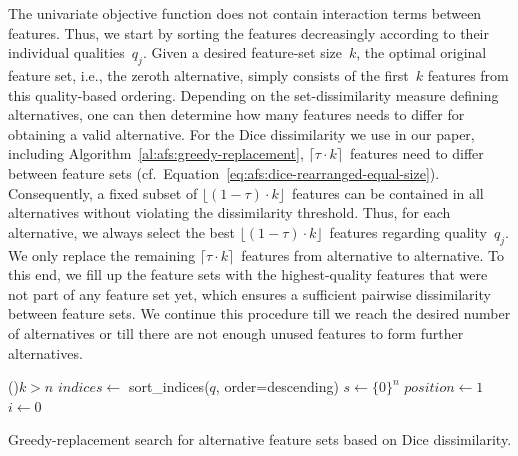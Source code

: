 \documentclass{article}
\theoremstyle{definition}
\begin{document}
The univariate objective function does not contain interaction terms between features.
Thus, we start by sorting the features decreasingly according to their individual qualities~$q_j$.
Given a desired feature-set size~$k$, the optimal original feature set, i.e., the zeroth alternative, simply consists of the first~$k$ features from this quality-based ordering.
Depending on the set-dissimilarity measure defining alternatives, one can then determine how many features needs to differ for obtaining a valid alternative.
For the Dice dissimilarity we use in our paper, including Algorithm~\ref{al:afs:greedy-replacement}, $\lceil \tau \cdot k \rceil$~features need to differ between feature sets (cf.~Equation~\ref{eq:afs:dice-rearranged-equal-size}).
Consequently, a fixed subset of $\lfloor (1 - \tau) \cdot k \rfloor$~features can be contained in all alternatives without violating the dissimilarity threshold.
Thus, for each alternative, we always select the best $\lfloor (1 - \tau) \cdot k \rfloor$~features regarding quality~$q_j$.
We only replace the remaining $\lceil \tau \cdot k \rceil$~features from alternative to alternative.
To this end, we fill up the feature sets with the highest-quality features that were not part of any feature set yet, which ensures a sufficient pairwise dissimilarity between feature sets.
We continue this procedure till we reach the desired number of alternatives or till there are not enough unused features to form further alternatives.

\begin{algorithm}[htb]
	\DontPrintSemicolon
	\BlankLine
	\If(){$k > n$}{
		\Return{$\emptyset$}
	}
	$indices \leftarrow$ sort\_indices($q$, order=descending) 
	$s \leftarrow \{0\}^n$ 
	$position \leftarrow 1$ 
	$i \leftarrow 0$\ 
	\caption{Greedy-replacement search for alternative feature sets based on Dice dissimilarity.}
	\label{al:afs:greedy-replacement}
\end{algorithm}
\end{document}
